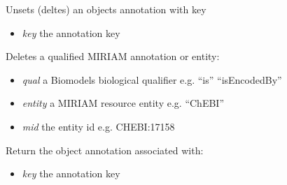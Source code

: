 \documentclass[a4paper,11pt,english]{sphinxmanual}
\begin{document}
\begin{fulllineitems}
\begin{fulllineitems}
\end{fulllineitems}


\begin{fulllineitems}
\label{modules_doc:cbmpy.CBModel.Fbase.deleteAnnotation}
Unsets (deltes) an objects annotation with key
\begin{itemize}
\item {} 
\emph{key} the annotation key

\end{itemize}

\end{fulllineitems}


\begin{fulllineitems}
\label{modules_doc:cbmpy.CBModel.Fbase.deleteMIRIAMannotation}
Deletes a qualified MIRIAM annotation or entity:
\begin{itemize}
\item {} 
\emph{qual} a Biomodels biological qualifier e.g. ``is'' ``isEncodedBy''

\item {} 
\emph{entity} a MIRIAM resource entity e.g. ``ChEBI''

\item {} 
\emph{mid} the entity id e.g. CHEBI:17158

\end{itemize}

\end{fulllineitems}


\begin{fulllineitems}
\label{modules_doc:cbmpy.CBModel.Fbase.getAnnotation}
Return the object annotation associated with:
\begin{itemize}
\item {} 
\emph{key} the annotation key

\end{itemize}

\end{fulllineitems}


\end{fulllineitems}
\end{document}
